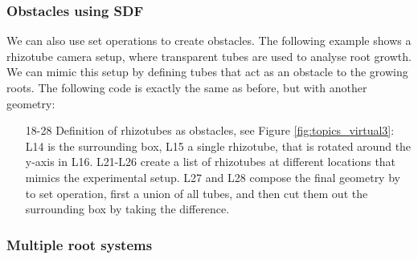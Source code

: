 

\subsubsection*{Obstacles using SDF}

We can also use set operations to create obstacles. The following example shows a rhizotube camera setup, where transparent tubes are used to analyse root growth. We can mimic this setup by defining tubes that act as an obstacle to the growing roots. The following code is exactly the same as before, but with another geometry: 



\begin{itemize}
\item[18-28] Definition of rhizotubes as obstacles, see Figure \ref{fig:topics_virtual3}: L14 is the surrounding box, L15 a single rhizotube, that is rotated around the y-axis in L16. L21-L26 create a list of rhizotubes at different locations that mimics the experimental setup.  L27 and L28 compose the final geometry by to set operation, first a union of all tubes, and then cut them out the surrounding box by taking the difference. 
\end{itemize}


\subsubsection*{Multiple root systems}


